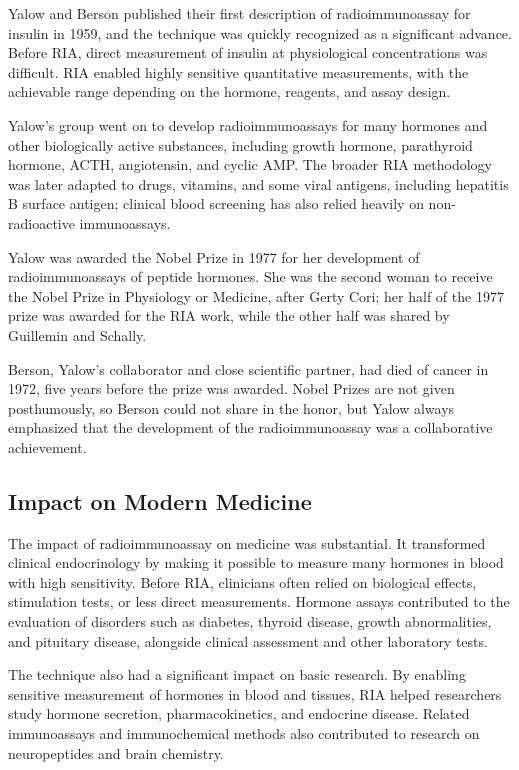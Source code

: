 Yalow and Berson published their first description of radioimmunoassay for insulin in 1959, and the technique was quickly recognized as a significant advance. Before RIA, direct measurement of insulin at physiological concentrations was difficult. RIA enabled highly sensitive quantitative measurements, with the achievable range depending on the hormone, reagents, and assay design.

Yalow's group went on to develop radioimmunoassays for many hormones and other biologically active substances, including growth hormone, parathyroid hormone, ACTH, angiotensin, and cyclic AMP. The broader RIA methodology was later adapted to drugs, vitamins, and some viral antigens, including hepatitis B surface antigen; clinical blood screening has also relied heavily on non-radioactive immunoassays.

Yalow was awarded the Nobel Prize in 1977 for her development of radioimmunoassays of peptide hormones. She was the second woman to receive the Nobel Prize in Physiology or Medicine, after Gerty Cori; her half of the 1977 prize was awarded for the RIA work, while the other half was shared by Guillemin and Schally.

Berson, Yalow's collaborator and close scientific partner, had died of cancer in 1972, five years before the prize was awarded. Nobel Prizes are not given posthumously, so Berson could not share in the honor, but Yalow always emphasized that the development of the radioimmunoassay was a collaborative achievement.

\subsection{Impact on Modern Medicine}

The impact of radioimmunoassay on medicine was substantial. It transformed clinical endocrinology by making it possible to measure many hormones in blood with high sensitivity. Before RIA, clinicians often relied on biological effects, stimulation tests, or less direct measurements. Hormone assays contributed to the evaluation of disorders such as diabetes, thyroid disease, growth abnormalities, and pituitary disease, alongside clinical assessment and other laboratory tests.

The technique also had a significant impact on basic research. By enabling sensitive measurement of hormones in blood and tissues, RIA helped researchers study hormone secretion, pharmacokinetics, and endocrine disease. Related immunoassays and immunochemical methods also contributed to research on neuropeptides and brain chemistry.


